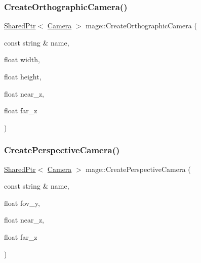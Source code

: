 \hypertarget{namespacemage_a16a1ce53c6e6780ead2325cf3741a36f}{}\label{namespacemage_a16a1ce53c6e6780ead2325cf3741a36f} 
\subsubsection{\texorpdfstring{Create\+Orthographic\+Camera()}{CreateOrthographicCamera()}}
{\footnotesize\ttfamily \hyperlink{namespacemage_a1e01ae66713838a7a67d30e44c67703e}{Shared\+Ptr}$<$ \hyperlink{classmage_1_1_camera}{Camera} $>$ mage\+::\+Create\+Orthographic\+Camera (\begin{DoxyParamCaption}\item[{const string \&}]{name,  }\item[{float}]{width,  }\item[{float}]{height,  }\item[{float}]{near\+\_\+z,  }\item[{float}]{far\+\_\+z }\end{DoxyParamCaption})}

\hypertarget{namespacemage_a9d39e62839bab5c922dec04c286dc511}{}\label{namespacemage_a9d39e62839bab5c922dec04c286dc511} 
\subsubsection{\texorpdfstring{Create\+Perspective\+Camera()}{CreatePerspectiveCamera()}}
{\footnotesize\ttfamily \hyperlink{namespacemage_a1e01ae66713838a7a67d30e44c67703e}{Shared\+Ptr}$<$ \hyperlink{classmage_1_1_camera}{Camera} $>$ mage\+::\+Create\+Perspective\+Camera (\begin{DoxyParamCaption}\item[{const string \&}]{name,  }\item[{float}]{fov\+\_\+y,  }\item[{float}]{near\+\_\+z,  }\item[{float}]{far\+\_\+z }\end{DoxyParamCaption})}

\hypertarget{namespacemage_a9f3a3ef8e9a08654f98dfaa2e6c77da8}{}\label{namespacemage_a9f3a3ef8e9a08654f98dfaa2e6c77da8} 
